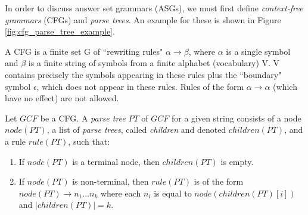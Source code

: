 In order to discuss answer set grammars (ASGs), we must first define \textit{context-free grammars} (CFGs) and \textit{parse trees}. An example for these is shown in Figure \ref{fig:cfg_parse_tree_example}.

\begin{definition}
A CFG is a finite set G of ``rewriting rules" $\alpha \to \beta$, where $\alpha$ is a single symbol and $\beta$ is a finite string of symbols from a finite alphabet (vocabulary) V. V contains precisely the symbols appearing in these rules plus the ``boundary" symbol $\epsilon$, which does not appear in these rules. Rules of the form $\alpha \to \alpha$ (which have no effect) are not allowed.
\end{definition}


\begin{definition}
Let $GCF$ be a CFG. A \textit{parse tree} $PT$ of $GCF$ for a given string consists of a node $node(PT)$, a list of \textit{parse trees}, called \textit{children} and denoted $children(PT)$, and a rule $rule(PT)$, such that:
\begin{enumerate}[nolistsep]
\item If $node(PT)$ is a terminal node, then $children(PT)$ is empty.
\item If $node(PT)$ is non-terminal, then $rule(PT)$ is of the form $node(PT) \to n_1 ... n_k$ where each $n_i$ is equal to $node(children(PT)[i])$ and $|children(PT)| = k$.
\end{enumerate}
\end{definition}

